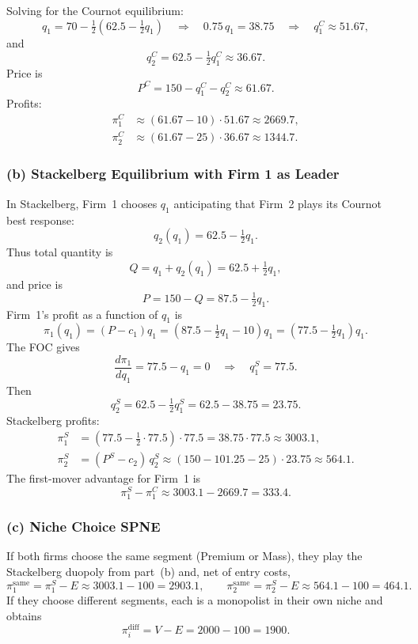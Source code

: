 \documentclass[12pt,a4paper]{article}
\begin{document}
Solving for the Cournot equilibrium:
\[
  q_1 = 70 - \tfrac{1}{2}(62.5 - \tfrac{1}{2}q_1)
  \quad\Longrightarrow\quad
  0.75\,q_1 = 38.75
  \quad\Longrightarrow\quad
  q_1^C \approx 51.67,
\]
and
\[
  q_2^C = 62.5 - \tfrac{1}{2}q_1^C \approx 36.67.
\]
Price is
\[
  P^C = 150 - q_1^C - q_2^C \approx 61.67.
\]
Profits:
\begin{align*}
  \pi_1^C &\approx (61.67 - 10)\cdot 51.67 \approx 2669.7,\\
  \pi_2^C &\approx (61.67 - 25)\cdot 36.67 \approx 1344.7.
\end{align*}

\subsubsection*{(b) Stackelberg Equilibrium with Firm 1 as Leader}

In Stackelberg, Firm~1 chooses \(q_1\) anticipating that Firm~2 plays its Cournot best response:
\[
  q_2(q_1) = 62.5 - \tfrac{1}{2}q_1.
\]
Thus total quantity is
\[
  Q = q_1 + q_2(q_1) = 62.5 + \tfrac{1}{2}q_1,
\]
and price is
\[
  P = 150 - Q = 87.5 - \tfrac{1}{2}q_1.
\]
Firm~1's profit as a function of \(q_1\) is
\[
  \pi_1(q_1) = (P - c_1)q_1
             = (87.5 - \tfrac{1}{2}q_1 - 10)q_1
             = (77.5 - \tfrac{1}{2}q_1)q_1.
\]
The FOC gives
\[
  \frac{d\pi_1}{dq_1} = 77.5 - q_1 = 0
  \quad\Longrightarrow\quad
  q_1^S = 77.5.
\]
Then
\[
  q_2^S = 62.5 - \tfrac{1}{2}q_1^S = 62.5 - 38.75 = 23.75.
\]
Stackelberg profits:
\begin{align*}
  \pi_1^S &= (77.5 - \tfrac{1}{2}\cdot 77.5)\cdot 77.5
          = 38.75 \cdot 77.5
          \approx 3003.1, \\
  \pi_2^S &= (P^S - c_2)\,q_2^S
          \approx (150 - 101.25 - 25)\cdot 23.75
          \approx 564.1.
\end{align*}
The first-mover advantage for Firm~1 is
\[
  \pi_1^S - \pi_1^C \approx 3003.1 - 2669.7 = 333.4.
\]

\subsubsection*{(c) Niche Choice SPNE}

If both firms choose the same segment (Premium or Mass), they play the Stackelberg duopoly from
part~(b) and, net of entry costs,
\[
  \pi_1^{\text{same}} = \pi_1^S - E \approx 3003.1 - 100 = 2903.1,\qquad
  \pi_2^{\text{same}} = \pi_2^S - E \approx 564.1 - 100 = 464.1.
\]
If they choose different segments, each is a monopolist in their own niche and obtains
\[
  \pi_i^{\text{diff}} = V - E = 2000 - 100 = 1900.
\]
\end{document}
